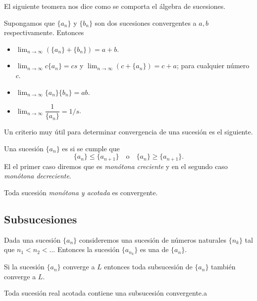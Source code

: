 El siguiente teomera nos dice como se comporta el álgebra de sucesiones.

\begin{teo}
	Supongamos que $\{ a_n \}$ y $\{ b_n \}$ son dos sucesiones convergentes a $a,b$ respectivamente. Entonces
	\begin{itemize}
		\item $ \lim_{n \to \infty} (\{ a_n \}+\{ b_n \}) = a+b $.
		\item $ \lim_{n \to \infty} c\{ a_n \}=cs$ y $ \lim_{n \to \infty} (c+\{ a_n \}) =c+a$; para cualquier número $c$.
		\item $ \lim_{n \to \infty} \{ a_n \}\{ b_n \}= ab$.
		\item $ \lim_{n \to \infty} \dfrac{1}{\{ a_n \}} = 1/s$.
	\end{itemize}
\end{teo}

Un criterio muy útil para determinar convergencia de una sucesión es el siguiente.

\begin{defi}
	Una sucesión $\{ a_n \}$ es  si se cumple que
	\[
		\{ a_n \}\leq\{ a_{n+1} \}\quad\text{o}\quad\{ a_n \}\geq\{ a_{n+1} \}.	
	\]
	El el primer caso diremos que es \emph{monótona creciente} y en el segundo caso \emph{monótona decreciente}.
\end{defi}

\begin{teo}\label{teo_monotono_acotado}
	Toda sucesión \emph{monótona y acotada} es convergente.
\end{teo}

\subsection{Subsucesiones}%
\label{sec:Subsucesiones}

\begin{defi}
	Dada una sucesión $\{ a_n \}$ consideremos una sucesión de números naturales $\{ n_k \}$ tal que $n_1<n_{2}<\dots$
	Entonces la sucesión $\{ a_{n_k} \}$ es una  de $\{ a_n \}$.
\end{defi}

Si la sucesión $\{ a_n \}$ converge a $L$ entonces toda subsucesión de $\{ a_n \}$ también converge a $L$.

\begin{teo}
	\normalmarginpar{}
	Toda sucesión real acotada contiene una subsucesión convergente.a
\end{teo}


